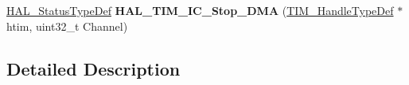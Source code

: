 \begin{DoxyCompactItemize}
\item 
\hypertarget{group___t_i_m___exported___functions___group4_ga8e7dc17f058ef9c826774436d68f80b5}{\hyperlink{stm32l1xx__hal__def_8h_a63c0679d1cb8b8c684fbb0632743478f}{H\-A\-L\-\_\-\-Status\-Type\-Def} {\bfseries H\-A\-L\-\_\-\-T\-I\-M\-\_\-\-I\-C\-\_\-\-Stop\-\_\-\-D\-M\-A} (\hyperlink{struct_t_i_m___handle_type_def}{T\-I\-M\-\_\-\-Handle\-Type\-Def} $\ast$htim, uint32\-\_\-t Channel)}\label{group___t_i_m___exported___functions___group4_ga8e7dc17f058ef9c826774436d68f80b5}

\end{DoxyCompactItemize}


\subsection{Detailed Description}
